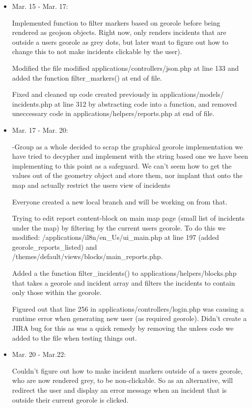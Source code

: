 \documentclass{article}
\begin{document}
\begin{itemize}
\item Mar. 15 - Mar. 17:
    
Implemented function to filter markers based on georole before being rendered as geojson objects. Right now, only renders incidents that are outside a users georole as grey dots, but later want to figure out how to change this to not make incidents clickable by the user).
    
Modified the file modified applications/controllers/json.php at line 133 and added the function filter\_markers() at end of file.
    
Fixed and cleaned up code created previously in applications/models/
incidents.php at line 312 by abstracting code into a function, 
and removed uneccessary code in 
applications/helpers/reports.php at end of file.
                
\item Mar. 17 - Mar. 20:

-Group as a whole decided to scrap the graphical georole implementation we have tried to decypher and implement with the string based one we have been implementing to this point as a safeguard.  We can't seem how to get the values out of the geometry object and store them, nor implant that onto the map and actually restrict the users view of incidents

Everyone created a new local branch and will be working on from that.
    
Trying to edit report content-block on main map page (small list of incidents under the map) by filtering by the current users georole.  To do this we modified: /applications/il8n/en\_Us/ui\_main.php at line 197 (added georole\_reports\_listed) and /themes/default/views/blocks/main\_reports.php.
          
Added a the function filter\_incidents() to applications/helpers/blocks.php that takes a georole and incident array and filters the incidents to contain only those within the georole.
 
Figured out that line 256 in applications/controllers/login.php was causing a runtime error when generating new user (as required georole).  Didn't create a JIRA bug for this as was a quick remedy by removing the unlees code we added to the file when testing things out.
                      
\item Mar. 20 - Mar.22:

Couldn't figure out how to make incident markers outside of a users georole, who are now rendered grey, to be non-clickable. So as an alternative, will redirect the user and display an error message when an incident that is outside their current georole is clicked.
    

\end{itemize}
\end{document}
